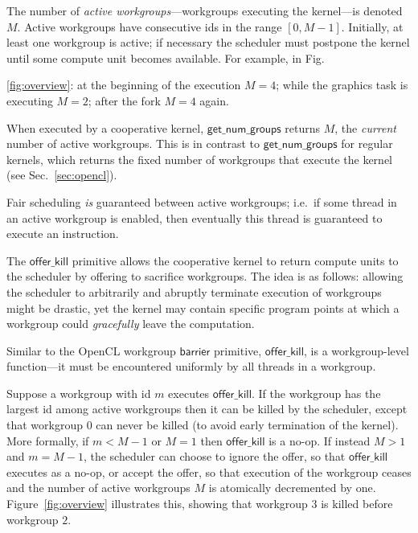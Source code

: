\documentclass[sigconf]{acmart}
\newcommand{\myfig}{Fig.~}
\newcommand{\myfiglong}{Figure~}
\newcommand{\mysec}{Sec.~}
\newcommand{\offerkill}{\mathsf{offer\_kill}}
\newcommand{\getnumgroups}{\mathsf{get\_num\_groups}}
\begin{document}
The number of \emph{active workgroups}---workgroups executing the
kernel---is denoted $M$.  Active workgroups have consecutive ids in
the range $[0, M-1]$.  Initially, at least one workgroup is active; if
necessary the scheduler must postpone the kernel until some compute
unit becomes available. For example, in \myfig{\ref{fig:overview}: at the
  beginning of the execution $M = 4$; while the graphics task is
  executing $M = 2$; after the fork $M = 4$ again.

When executed by a cooperative
kernel, $\getnumgroups$ returns $M$, the \emph{current} number of
active workgroups.  This is in contrast to $\getnumgroups$ for
regular kernels, which returns the fixed number of workgroups that execute the kernel (see \mysec\ref{sec:opencl}).

Fair scheduling \emph{is} guaranteed between active workgroups;
i.e.\ if some thread in an active workgroup is enabled, then
eventually this thread is guaranteed to execute an instruction.


\myparagraph{Semantics for $\offerkill$}
%
The $\offerkill$ primitive allows the cooperative kernel to return
compute units to the scheduler by offering to sacrifice workgroups.
The idea is as follows: allowing the scheduler to arbitrarily and abruptly terminate execution
of workgroups might be drastic, yet the kernel
may contain specific program points at which a workgroup could
\emph{gracefully} leave the computation.

Similar to the OpenCL workgroup $\mathsf{barrier}$ primitive,
$\offerkill$, is a workgroup-level function---it must be encountered
uniformly by all threads in a workgroup.

Suppose a workgroup with id $m$ executes $\offerkill$.  If the
workgroup has the largest id among active workgroups then it
can be killed by the scheduler, except that workgroup 0 can never be
killed (to avoid early termination of the kernel).  More formally, if $m < M-1$ or $M=1$ then $\offerkill$ is a
no-op.  If instead $M > 1$ and $m = M-1$, the scheduler can choose to
ignore the offer, so that $\offerkill$ executes as a no-op, or accept
the offer, so that execution of the workgroup ceases and the number of
active workgroups $M$ is atomically decremented by one.
\myfiglong{\ref{fig:overview}} illustrates this, showing that
workgroup $3$ is killed before workgroup $2$.


}
\end{document}
